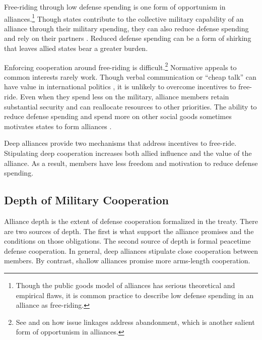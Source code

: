 \documentclass[12pt]{article}
\begin{document}
Free-riding through low defense spending is one form of opportunism in alliances.\footnote{Though the public goods model of alliances has serious theoretical and empirical flaws, it is common practice to describe low defense spending in an alliance as free-riding.}
Though states contribute to the collective military capability of an alliance through their military spending, they can also reduce defense spending and rely on their partners \citep{OlsonZeckhauser1966, Morrow1993, Conybeare1994, SandlerHartley2001}.
Reduced defense spending can be a form of shirking that leaves allied states bear a greater burden. 


Enforcing cooperation around free-riding is difficult.\footnote{See \citet{Poast2012, Poast2013} and \citet{LongLeeds2006} on how issue linkages address abandonment, which is another salient form of opportunism in alliances.}
Normative appeals to common interests rarely work. 
Though verbal communication or ``cheap talk'' can have value in international politics \citep{Trager2010}, it is unlikely to overcome incentives to free-ride. 
Even when they spend less on the military, alliance members retain substantial security and can reallocate resources to other priorities. 
The ability to reduce defense spending and spend more on other social goods sometimes motivates states to form alliances \citep{Kimball2010, AllenDigiuseppe2013}. 


Deep alliances provide two mechanisms that address incentives to free-ride. 
Stipulating deep cooperation increases both allied influence and the value of the alliance. 
As a result, members have less freedom and motivation to reduce defense spending. 



\subsection{Depth of Military Cooperation} 


Alliance depth is the extent of defense cooperation formalized in the treaty. 
There are two sources of depth. 
The first is what support the alliance promises and the conditions on those obligations. 
The second source of depth is formal peacetime defense cooperation. 
In general, deep alliances stipulate close cooperation between members.
By contrast, shallow alliances promise more arms-length cooperation. 
\end{document}
